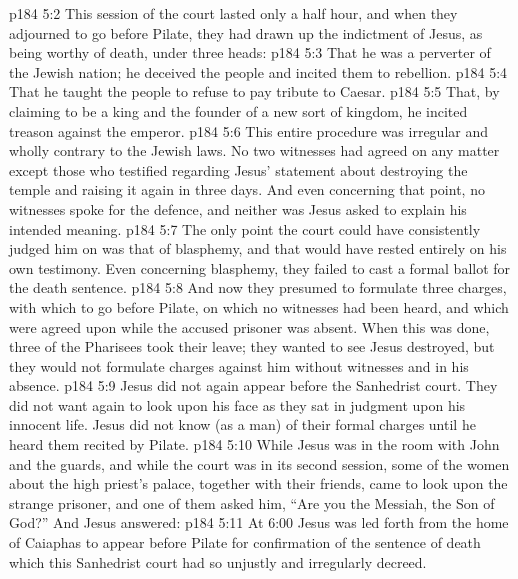 \vs p184 5:2 This session of the court lasted only a half hour, and when they adjourned to go before Pilate, they had drawn up the indictment of Jesus, as being worthy of death, under three heads:
\vs p184 5:3 \bibnobreakspace That he was a perverter of the Jewish nation; he deceived the people and incited them to rebellion.
\vs p184 5:4 \bibnobreakspace That he taught the people to refuse to pay tribute to Caesar.
\vs p184 5:5 \bibnobreakspace That, by claiming to be a king and the founder of a new sort of kingdom, he incited treason against the emperor.
\vs p184 5:6 \pc This entire procedure was irregular and wholly contrary to the Jewish laws. No two witnesses had agreed on any matter except those who testified regarding Jesus’ statement about destroying the temple and raising it again in three days. And even concerning that point, no witnesses spoke for the defence, and neither was Jesus asked to explain his intended meaning.
\vs p184 5:7 The only point the court could have consistently judged him on was that of blasphemy, and that would have rested entirely on his own testimony. Even concerning blasphemy, they failed to cast a formal ballot for the death sentence.
\vs p184 5:8 And now they presumed to formulate three charges, with which to go before Pilate, on which no witnesses had been heard, and which were agreed upon while the accused prisoner was absent. When this was done, three of the Pharisees took their leave; they wanted to see Jesus destroyed, but they would not formulate charges against him without witnesses and in his absence.
\vs p184 5:9 Jesus did not again appear before the Sanhedrist court. They did not want again to look upon his face as they sat in judgment upon his innocent life. Jesus did not know (as a man) of their formal charges until he heard them recited by Pilate.
\vs p184 5:10 \pc While Jesus was in the room with John and the guards, and while the court was in its second session, some of the women about the high priest’s palace, together with their friends, came to look upon the strange prisoner, and one of them asked him, “Are you the Messiah, the Son of God?” And Jesus answered: 
\vs p184 5:11 At 6:00 Jesus was led forth from the home of Caiaphas to appear before Pilate for confirmation of the sentence of death which this Sanhedrist court had so unjustly and irregularly decreed.
\quizlink
